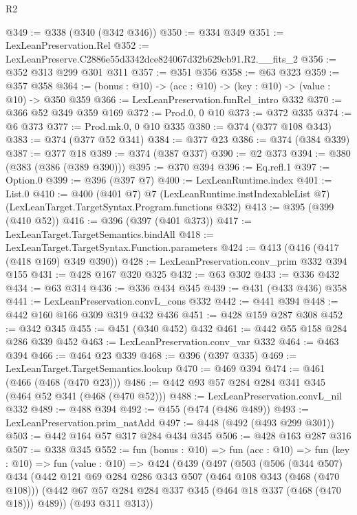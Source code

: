 \begin{lexlean}{R2}
\begin{coremodule}
@349 := @338 (@340 (@342 @346))
@350 := @334 @349
@351 := LexLeanPreservation.Rel
@352 := LexLeanPreserve.C2886e55d3342dce824067d32b629cb91.R2.__fits_2
@356 := @352 @313 @299 @301 @311
@357 := @351 @356
@358 := @63 @323
@359 := @357 @358
@364 := (bonus : @10) -> (acc : @10) -> (key : @10) -> (value : @10) -> @350 @359
@366 := LexLeanPreservation.funRel_intro @332
@370 := @366 @52 @349 @359 @169
@372 := Prod.{0, 0} @10
@373 := @372 @335
@374 := @6 @373
@377 := Prod.mk.{0, 0} @10 @335
@380 := @374 (@377 @108 @343)
@383 := @374 (@377 @52 @341)
@384 := @377 @23
@386 := @374 (@384 @339)
@387 := @377 @18
@389 := @374 (@387 @337)
@390 := @2 @373
@394 := @380 (@383 (@386 (@389 @390)))
@395 := @370 @394
@396 := Eq.refl.{1}
@397 := Option.{0}
@399 := @396 (@397 @7)
@400 := LexLeanRuntime.index
@401 := List.{0}
@410 := @400
    (@401 @7)
    @7
    (LexLeanRuntime.instIndexableList @7)
    (LexLeanTarget.TargetSyntax.Program.functions @332)
@413 := @395 (@399 (@410 @52))
@416 := @396 (@397 (@401 @373))
@417 := LexLeanTarget.TargetSemantics.bindAll
@418 := LexLeanTarget.TargetSyntax.Function.parameters
@424 := @413 (@416 (@417 (@418 @169) @349 @390))
@428 := LexLeanPreservation.conv_prim @332 @394 @155
@431 := @428 @167 @320 @325
@432 := @63 @302
@433 := @336 @432
@434 := @63 @314
@436 := @336 @434 @345
@439 := @431 (@433 @436) @358
@441 := LexLeanPreservation.convL_cons @332
@442 := @441 @394
@448 := @442 @160 @166 @309 @319 @432 @436
@451 := @428 @159 @287 @308
@452 := @342 @345
@455 := @451 (@340 @452) @432
@461 := @442 @55 @158 @284 @286 @339 @452
@463 := LexLeanPreservation.conv_var @332
@464 := @463 @394
@466 := @464 @23 @339
@468 := @396 (@397 @335)
@469 := LexLeanTarget.TargetSemantics.lookup
@470 := @469 @394
@474 := @461 (@466 (@468 (@470 @23)))
@486 := @442 @93 @57 @284 @284 @341 @345 (@464 @52 @341 (@468 (@470 @52)))
@488 := LexLeanPreservation.convL_nil @332
@489 := @488 @394
@492 := @455 (@474 (@486 @489))
@493 := LexLeanPreservation.prim_natAdd
@497 := @448 (@492 (@493 @299 @301))
@503 := @442 @164 @57 @317 @284 @434 @345
@506 := @428 @163 @287 @316
@507 := @338 @345
@552 := fun (bonus : @10) =>
  fun (acc : @10) =>
  fun (key : @10) =>
  fun (value : @10) =>
  @424
    (@439
      (@497
        (@503
          (@506
            (@344 @507)
            @434
            (@442
              @121
              @69
              @284
              @286
              @343
              @507
              (@464 @108 @343 (@468 (@470 @108)))
              (@442 @67 @57 @284 @284 @337 @345 (@464 @18 @337 (@468 (@470 @18))) @489))
            (@493 @311 @313))

\end{coremodule}
\end{lexlean}
